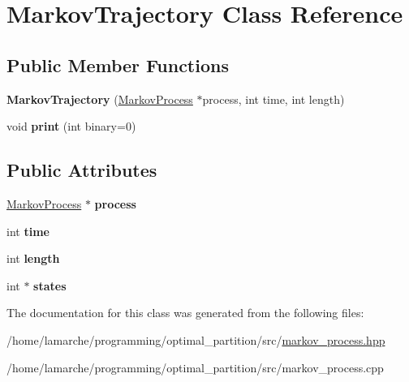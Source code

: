 \hypertarget{classMarkovTrajectory}{\section{Markov\-Trajectory Class Reference}
\label{classMarkovTrajectory}
}
\subsection*{Public Member Functions}
\begin{DoxyCompactItemize}
\item 
\hypertarget{classMarkovTrajectory_a87acf0aef9d85e369378d004e06c56de}{{\bfseries Markov\-Trajectory} (\hyperlink{classMarkovProcess}{Markov\-Process} $\ast$process, int time, int length)}\label{classMarkovTrajectory_a87acf0aef9d85e369378d004e06c56de}

\item 
\hypertarget{classMarkovTrajectory_a29bb2d19771e93e6c87204c8ac2b3bd1}{void {\bfseries print} (int binary=0)}\label{classMarkovTrajectory_a29bb2d19771e93e6c87204c8ac2b3bd1}

\end{DoxyCompactItemize}
\subsection*{Public Attributes}
\begin{DoxyCompactItemize}
\item 
\hypertarget{classMarkovTrajectory_ada9138be4456a51a6f86c491079b0a58}{\hyperlink{classMarkovProcess}{Markov\-Process} $\ast$ {\bfseries process}}\label{classMarkovTrajectory_ada9138be4456a51a6f86c491079b0a58}

\item 
\hypertarget{classMarkovTrajectory_ab9a7f6133864c100caee694f7fb5c272}{int {\bfseries time}}\label{classMarkovTrajectory_ab9a7f6133864c100caee694f7fb5c272}

\item 
\hypertarget{classMarkovTrajectory_a12f640932269482c40e2a8efb9ff61c1}{int {\bfseries length}}\label{classMarkovTrajectory_a12f640932269482c40e2a8efb9ff61c1}

\item 
\hypertarget{classMarkovTrajectory_af7aa190f73505e8eb514ca7725572268}{int $\ast$ {\bfseries states}}\label{classMarkovTrajectory_af7aa190f73505e8eb514ca7725572268}

\end{DoxyCompactItemize}


The documentation for this class was generated from the following files\-:\begin{DoxyCompactItemize}
\item 
/home/lamarche/programming/optimal\-\_\-partition/src/\hyperlink{markov__process_8hpp}{markov\-\_\-process.\-hpp}\item 
/home/lamarche/programming/optimal\-\_\-partition/src/markov\-\_\-process.\-cpp\end{DoxyCompactItemize}
